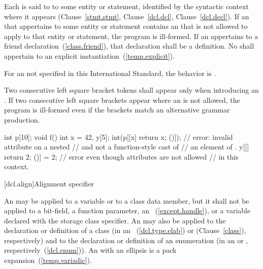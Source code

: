 \pnum
Each  is said to  to some entity or
statement, identified by the syntactic context where it appears
(Clause~\ref{stmt.stmt}, Clause~\ref{dcl.dcl},
Clause~\ref{dcl.decl}). If an  that appertains to some
entity or statement contains an  that
is not allowed to apply to that
entity or statement, the program is ill-formed. If an 
appertains to a friend declaration~(\ref{class.friend}), that declaration shall be a
definition. No  shall appertain to an explicit
instantiation~(\ref{temp.explicit}).

\pnum
For an  not specified in this International Standard, the
behavior is .

\pnum
Two consecutive left square bracket tokens shall appear only when introducing an
. \enternote If two consecutive left square brackets appear
where an  is not allowed, the program is ill-formed even
if the brackets match an alternative grammar production. \exitnote \enterexample
\begin{codeblock}
int p[10];
void f() {
  int x = 42, y[5];
  int(p[[x] { return x; }()]);  // error: invalid attribute on a nested
                                //  and not a function-style cast of
                                // an element of .
  y[[] { return 2; }()] = 2;    // error even though attributes are not allowed
                                // in this context.
}
\end{codeblock}
\exitexample

[dcl.align]{Alignment specifier}%

\pnum
An 
may be applied to a variable
or to a class data member, but it shall not be applied to a bit-field, a function
parameter, an ~(\ref{except.handle}), or a variable
declared with the  storage class specifier.
An  may also be applied to the declaration or
definition of a class (in an
~(\ref{dcl.type.elab}) or
 (Clause~\ref{class}), respectively) and to the
declaration or definition of an enumeration (in an
 or ,
respectively~(\ref{dcl.enum})).
An  with an ellipsis is a pack expansion~(\ref{temp.variadic}).

